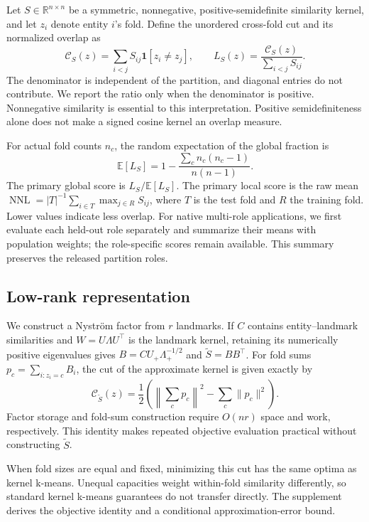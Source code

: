 \documentclass[12pt]{article}
\newcommand{\R}{\mathbb{R}}
\newcommand{\cut}{\mathcal{C}}
\newcommand{\nnl}{\operatorname{NNL}}
\begin{document}
Let $S\in\R^{n\times n}$ be a symmetric, nonnegative, positive-semidefinite
similarity kernel, and let $z_i$ denote entity $i$'s fold. Define the unordered
cross-fold cut and its normalized overlap as
\begin{equation}
 \cut_S(z)=\sum_{i<j}S_{ij}\mathbf{1}[z_i\ne z_j],
 \qquad L_S(z)=\frac{\cut_S(z)}{\sum_{i<j}S_{ij}}.
 \label{eq:cut}
\end{equation}
The denominator is independent of the partition, and diagonal entries do not
contribute. We report the ratio only when the denominator is positive. Nonnegative
similarity is essential to this interpretation. Positive semidefiniteness alone
does not make a signed cosine kernel an overlap measure.

For actual fold counts $n_c$, the random expectation of the global fraction is
\begin{equation}
 \mathbb{E}[L_S]=1-\frac{\sum_c n_c(n_c-1)}{n(n-1)}.
 \label{eq:random}
\end{equation}
The primary global score is $L_S/\mathbb{E}[L_S]$.
The primary local score is the raw mean
$\nnl=|T|^{-1}\sum_{i\in T}\max_{j\in R}S_{ij}$, where $T$ is the test fold
and $R$ the training fold. Lower values indicate less overlap.
For native multi-role applications, we first evaluate each held-out role
separately and summarize their means with population weights; the role-specific
scores remain available. This summary preserves the released partition roles.

\subsection{Low-rank representation}

We construct a Nystr\"om factor from $r$ landmarks. If $C$ contains
entity--landmark similarities and $W=U\Lambda U^\top$ is the landmark kernel,
retaining its numerically positive eigenvalues gives
$B=CU_+\Lambda_+^{-1/2}$ and $\widetilde S=BB^\top$.
For fold sums $p_c=\sum_{i:z_i=c}B_i$, the cut of the approximate kernel is given exactly by
\begin{equation}
 \cut_{\widetilde S}(z)=
 \frac12\left(\left\|\sum_c p_c\right\|^2-\sum_c\|p_c\|^2\right).
 \label{eq:factor}
\end{equation}
Factor storage and fold-sum construction require $O(nr)$ space and work,
respectively. This identity makes repeated objective evaluation practical
without constructing $\widetilde S$.

When fold sizes are equal and fixed, minimizing this cut has the same optima as
kernel k-means. Unequal capacities weight within-fold similarity differently,
so standard kernel k-means guarantees do not transfer directly. The supplement
derives the objective identity and a conditional approximation-error bound.
\end{document}
